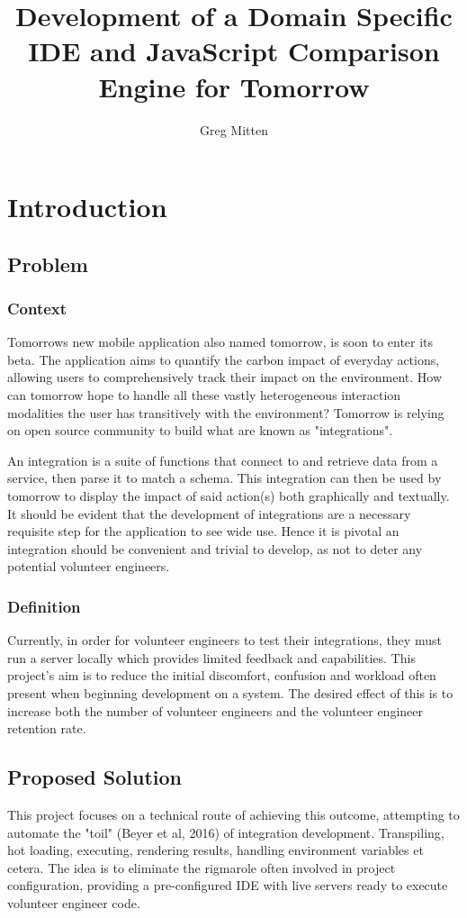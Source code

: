 \documentclass[jou,apacite]{apa6}
\title{Development of a Domain Specific IDE and JavaScript Comparison Engine for Tomorrow}
\author{Greg Mitten}
\affiliation{University of Sussex}
\begin{document}
\maketitle    
                        
\section{Introduction}
\subsection{Problem}
\subsubsection{Context}
Tomorrow\textquotesingle s new mobile application also named tomorrow, is soon to enter its beta. The application aims to quantify the carbon impact of everyday actions, allowing users to comprehensively track their impact on the environment. How can tomorrow hope to handle all these vastly heterogeneous interaction modalities the user has transitively with the environment? Tomorrow is relying on open source community to build what are known as "integrations".

An integration is a suite of functions that connect to and retrieve data from a service, then parse it to match a schema. This integration can then be used by tomorrow to display the impact of said action(s) both graphically and textually. It should be evident that the development of integrations are a necessary requisite step for the application to see wide use. Hence it is pivotal an integration should be convenient and trivial to develop, as not to deter any potential volunteer engineers.
\subsubsection{Definition}
Currently, in order for volunteer engineers to test their integrations, they must run a server locally which provides limited feedback and capabilities. This project’s aim is to reduce the initial discomfort, confusion and workload often present when beginning development on a system. The desired effect of this is to increase both the number of volunteer engineers and the volunteer engineer retention rate.

\subsection{Proposed Solution}
This project focuses on a technical route of achieving this outcome, attempting to automate the "toil" (Beyer et al, 2016) of integration development.  Transpiling, hot loading, executing, rendering results, handling environment variables et cetera. The idea is to eliminate the rigmarole often involved in project configuration, providing a pre-configured IDE with live servers ready to execute volunteer engineer code. 
\end{document}
